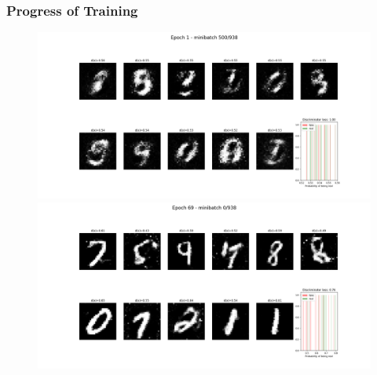 \documentclass[12pt, fleqn, titlepage]{article}
\begin{document}
\subsubsection{Progress of Training}

\begin{figure}[H]
	\centering
	\includegraphics[width=\linewidth]{imgs/MNIST_GAN_normal_result_epoch_0_minibatch_500}
	\hfill
	\includegraphics[width=\linewidth]{imgs/MNIST_GAN_normal_result_epoch_68_minibatch_0}
\end{figure}
\end{document}
